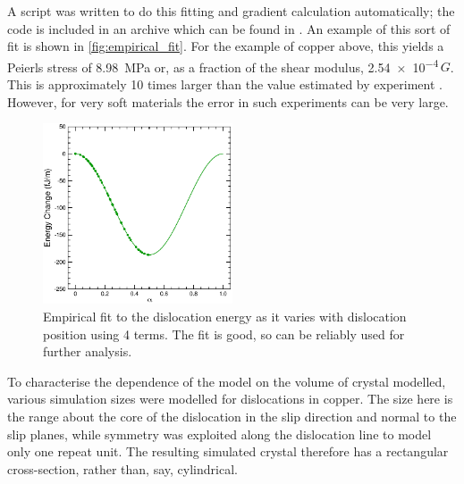 A script was written to do this fitting and gradient calculation automatically; the code is included in an archive which can be found in \cite{code}. An example of this sort of fit is shown in \autoref{fig:empirical_fit}. For the example of copper above, this yields a Peierls stress of \SI{8.98}{\mega\pascal} or, as a fraction of the shear modulus, \num{2.54e-4}\,$G$. This is approximately 10 times larger than the value estimated by experiment \cite{Wang1996}. However, for very soft materials the error in such experiments can be very large.

\begin{figure}
\centering
\includegraphics[width=0.5\textwidth]{Empirical_Fit}
\caption[Empirical fit to the variation in energy with dislocation position.]{Empirical fit to the dislocation energy as it varies with dislocation position using 4 terms. The fit is good, so can be reliably used for further analysis.\label{fig:empirical_fit}}
\end{figure}


To characterise the dependence of the model on the volume of crystal modelled, various simulation sizes were modelled for dislocations in copper. The size here is the range about the core of the dislocation in the slip direction and normal to the slip planes, while symmetry was exploited along the dislocation line to model only one repeat unit. The resulting simulated crystal therefore has a rectangular cross-section, rather than, say, cylindrical.


